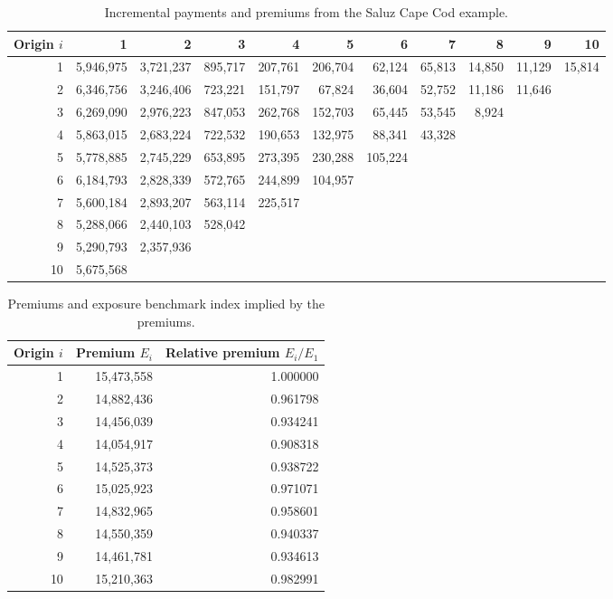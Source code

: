 \documentclass[11pt]{article}
\newcommand{\1}{\mathbf{1}}
\begin{document}
\begin{table}[htbp]
\centering
\scriptsize
\setlength{\tabcolsep}{3.5pt}
\begin{tabular}{r*{10}{r}}
\toprule
Origin $i$ & 1 & 2 & 3 & 4 & 5 & 6 & 7 & 8 & 9 & 10  \\
\midrule
1  & 5,946,975 & 3,721,237 & 895,717 & 207,761 & 206,704 & 62,124 & 65,813 & 14,850 & 11,129 & 15,814  \\
2  & 6,346,756 & 3,246,406 & 723,221 & 151,797 & 67,824 & 36,604 & 52,752 & 11,186 & 11,646 &        \\
3  & 6,269,090 & 2,976,223 & 847,053 & 262,768 & 152,703 & 65,445 & 53,545 & 8,924 &        &         \\
4  & 5,863,015 & 2,683,224 & 722,532 & 190,653 & 132,975 & 88,341 & 43,328 &        &        &         \\
5  & 5,778,885 & 2,745,229 & 653,895 & 273,395 & 230,288 & 105,224 &        &        &        &         \\
6  & 6,184,793 & 2,828,339 & 572,765 & 244,899 & 104,957 &        &        &        &        &         \\
7  & 5,600,184 & 2,893,207 & 563,114 & 225,517 &        &        &        &        &        &         \\
8  & 5,288,066 & 2,440,103 & 528,042 &        &        &        &        &        &        &         \\
9  & 5,290,793 & 2,357,936 &        &        &        &        &        &        &        &         \\
10 & 5,675,568 &        &        &        &        &        &        &        &        &         \\
\bottomrule
\end{tabular}
\caption{Incremental payments and premiums from the Saluz Cape Cod example.}
\label{tab:saluz_incremental}
\end{table}

\begin{table}[htbp]
\centering
\begin{tabular}{rrr}
\toprule
Origin $i$ & Premium $E_i$ & Relative premium $E_i/E_1$ \\
\midrule
1  & 15,473,558 & 1.000000 \\
2  & 14,882,436 & 0.961798 \\
3  & 14,456,039 & 0.934241 \\
4  & 14,054,917 & 0.908318 \\
5  & 14,525,373 & 0.938722 \\
6  & 15,025,923 & 0.971071 \\
7  & 14,832,965 & 0.958601 \\
8  & 14,550,359 & 0.940337 \\
9  & 14,461,781 & 0.934613 \\
10 & 15,210,363 & 0.982991 \\
\bottomrule
\end{tabular}
\caption{Premiums and exposure benchmark index implied by the premiums.}
\label{tab:saluz_exposures}
\end{table}
\end{document}
